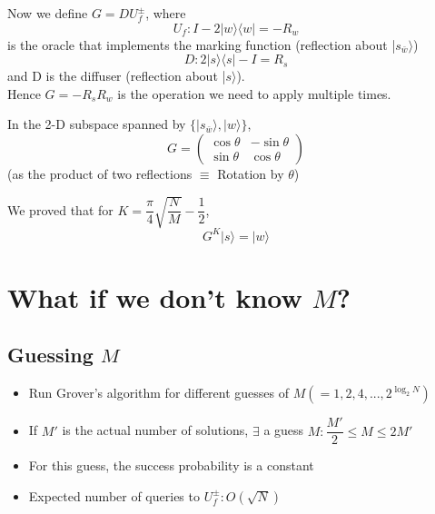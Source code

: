 \documentclass[11.5pt, paper=a4]{article}
\theoremstyle{definition}
\numberwithin{theorem}{section}
\begin{document}
\vspace{5mm}

Now we define $G = D U_f^{\pm}$, where
\begin{equation}
U_f : I - 2|w\rangle \langle w| = - R_w
\end{equation}
is the oracle that implements the marking function (reflection about |$s_{\bar{w}}\rangle$)
\begin{equation}
D : 2|s\rangle \langle s| - I = R_s
\end{equation}
and D is the diffuser (reflection about |$s \rangle$). \\
Hence $G = - R_s R_w$ is the operation we need to apply multiple times.

\vspace{5mm}

In the 2-D subspace spanned by $\{ |s_{\bar{w}} \rangle, |w \rangle \}$,
\begin{equation}
G = \begin{pmatrix}
\cos{\theta} & -\sin{\theta} \\
\sin{\theta} & \cos{\theta}
\end{pmatrix}
\end{equation}
(as the product of two reflections $\equiv$ Rotation by $\theta$)

\vspace{5mm}

We proved that for $K = \dfrac{\pi}{4}\sqrt{\dfrac{N}{M}} - \dfrac{1}{2}$, 
\begin{equation}
G^K |s \rangle = | w \rangle
\end{equation}

\section{What if we don't know $M$?}
\subsection{Guessing $M$}
\begin{itemize}
\item Run Grover's algorithm for different guesses of $M (= 1, 2, 4, ..., 2^{\log_2N})$

\item If $M'$ is the actual number of solutions, $\exists$ a guess $M: \dfrac{M'}{2} \leq M \leq 2M'$

\item For this guess, the success probability is a constant

\item Expected number of queries to $U_f^{\pm}: O(\sqrt{N})$
\end{itemize}
\end{document}
